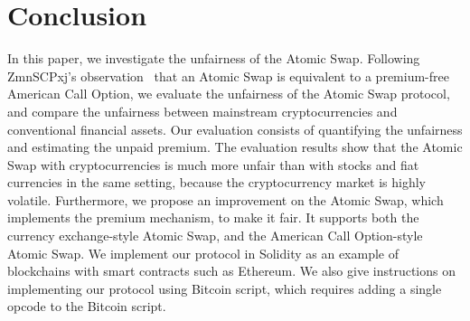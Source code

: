 \section{Conclusion}
\label{sec:conclusion}


In this paper, we investigate the unfairness of the Atomic Swap.
Following ZmnSCPxj's observation~\cite{optionality-origin} that an Atomic Swap is equivalent to a premium-free American Call Option, we evaluate the unfairness of the Atomic Swap protocol, and compare the unfairness between mainstream cryptocurrencies and conventional financial assets.
Our evaluation consists of quantifying the unfairness and estimating the unpaid premium.
The evaluation results show that the Atomic Swap with cryptocurrencies is much more unfair than with stocks and fiat currencies in the same setting, because the cryptocurrency market is highly volatile.
Furthermore, we propose an improvement on the Atomic Swap, which implements the premium mechanism, to make it fair.
It supports both the currency exchange-style Atomic Swap, and the American Call Option-style Atomic Swap.
We implement our protocol in Solidity as an example of blockchains with smart contracts such as Ethereum.
We also give instructions on implementing our protocol using Bitcoin script, which requires adding a single opcode to the Bitcoin script.